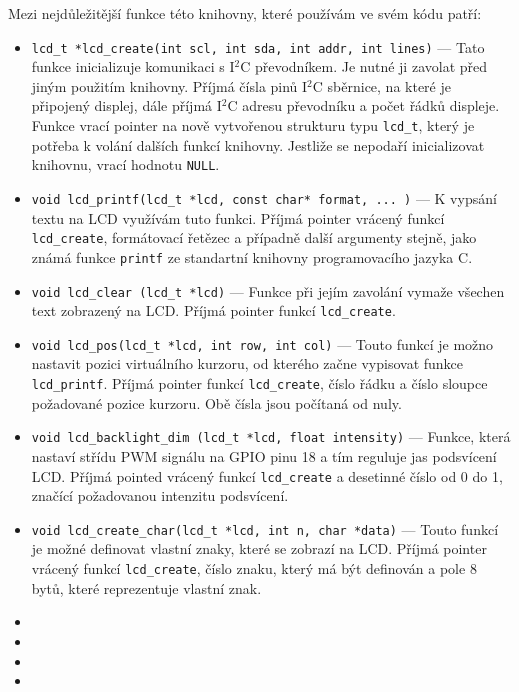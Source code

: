 Mezi nejdůležitější funkce této knihovny, které používám ve svém kódu patří:
\begin{itemize}
    \item \texttt{lcd_t *lcd_create(int scl, int sda, int addr, int lines)} --- Tato funkce inicializuje komunikaci s I$^{2}$C převodníkem. Je nutné ji zavolat před jiným použitím knihovny.
          Příjmá čísla pinů I$^{2}$C sběrnice, na které je připojený displej, dále příjmá I$^{2}$C adresu převodníku a počet řádků displeje. Funkce vrací pointer na nově vytvořenou strukturu typu \texttt{lcd_t}, který je potřeba k volání dalších funkcí knihovny. Jestliže se nepodaří inicializovat knihovnu, vrací hodnotu \texttt{NULL}.
    \item \texttt{void lcd_printf(lcd_t *lcd, const char* format, ... )} --- K vypsání textu na LCD využívám tuto funkci. Příjmá pointer vrácený funkcí \texttt{lcd_create}, formátovací řetězec a případně další argumenty stejně, jako známá funkce \texttt{printf} ze standartní knihovny programovacího jazyka C.
    \item \texttt{void lcd_clear (lcd_t *lcd)} --- Funkce při jejím zavolání vymaže všechen text zobrazený na LCD. Příjmá pointer funkcí \texttt{lcd_create}.
    \item \texttt{void lcd_pos(lcd_t *lcd, int row, int col)} --- Touto funkcí je možno nastavit pozici virtuálního kurzoru, od kterého začne vypisovat funkce \texttt{lcd_printf}. Příjmá  pointer funkcí \texttt{lcd_create}, číslo řádku a číslo sloupce požadované pozice kurzoru. Obě čísla jsou počítaná od nuly.
    \item \texttt{void lcd_backlight_dim (lcd_t *lcd, float intensity)} --- Funkce, která nastaví střídu PWM signálu na GPIO pinu 18 a tím reguluje jas podsvícení LCD. Příjmá pointed vrácený funkcí \texttt{lcd_create} a desetinné číslo od 0 do 1, značící požadovanou intenzitu podsvícení.
    \item \texttt{void lcd_create_char(lcd_t *lcd, int n, char *data)} --- Touto funkcí je možné definovat vlastní znaky, které se zobrazí na LCD. Příjmá pointer vrácený funkcí \texttt{lcd_create}, číslo znaku, který má být definován a pole 8 bytů, které reprezentuje vlastní znak.
    \item \texttt{}
    \item \texttt{}
    \item \texttt{}
    \item \texttt{}
\end{itemize}

